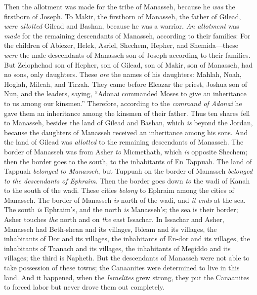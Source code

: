 \begin{biblechapter} %
 Then the allotment was made for the tribe of Manasseh, because he \textit{was} the firstborn of Joseph. To Makir, the firstborn of Manasseh, the father of Gilead, \textit{were allotted} Gilead and Bashan, because he was a warrior.
\verse \textit{An allotment} was \textit{made} for the remaining descendants of Manasseh, according to their families: For the children of Abiezer, Helek, Asriel, Shechem, Hepher, and Shemida—these \textit{were} the male descendants of Manasseh son of Joseph according to their families.
\verse But Zelophehad son of Hepher, son of Gilead, son of Makir, son of Manasseh, had no sons, only daughters. These \textit{are} the names of his daughters: Mahlah, Noah, Hoglah, Milcah, and Tirzah.
\verse They came before Eleazar the priest, Joshua son of Nun, and the leaders, saying, “Adonai commanded Moses to give an inheritance to us among our kinsmen.” Therefore, according to the \textit{command of Adonai} he gave them an inheritance among the kinsmen of their father.
\verse Thus ten shares fell to Manasseh, besides the land of Gilead and Bashan, which \textit{is} beyond the Jordan,
\verse because the daughters of Manasseh received an inheritance among his sons. And the land of Gilead was \textit{allotted} to the remaining descendants of Manasseh.
\verse The border of Manasseh was from Asher \textit{to} Micmethath, which \textit{is} opposite Shechem; then the border goes to the south, to the inhabitants of En Tappuah.
\verse The land of Tappuah \textit{belonged to Manasseh}, but Tuppuah on the border of Manasseh \textit{belonged to the descendants of Ephraim}.
\verse Then the border goes down \textit{to} the wadi of Kanah to the south of the wadi. These cities \textit{belong} to Ephraim among the cities of Manasseh. The border of Manasseh \textit{is} north of the wadi, and \textit{it ends} at the sea.
\verse The south \textit{is} Ephraim’s, and the north \textit{is} Manasseh’s; the sea is their border; Asher touches \textit{the} north and on \textit{the} east Issachar.
\verse In Issachar and Asher, Manasseh had Beth-shean and its villages, Ibleam and its villages, the inhabitants of Dor and its villages, the inhabitants of En-dor and its villages, the inhabitants of Taanach and its villages, the inhabitants of Megiddo and its villages; the third is Napheth.
\verse But the descendants of Manasseh were not able to take possession of these towns; the Canaanites were determined to live in this land.
\verse And it happened, when the \textit{Israelites} grew strong, they put the Canaanites to forced labor but never drove them out completely.

\end{biblechapter}
